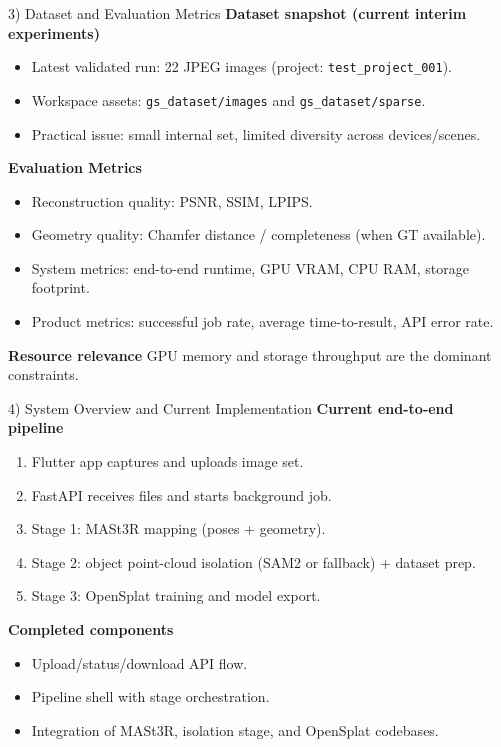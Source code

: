 \documentclass[aspectratio=169]{beamer}
\begin{document}
\begin{frame}{3) Dataset and Evaluation Metrics}
\textbf{Dataset snapshot (current interim experiments)}
\begin{itemize}
  \item Latest validated run: 22 JPEG images (project: \texttt{test\_project\_001}).
  \item Workspace assets: \texttt{gs\_dataset/images} and \texttt{gs\_dataset/sparse}.
  \item Practical issue: small internal set, limited diversity across devices/scenes.
\end{itemize}

\vspace{0.4em}
\textbf{Evaluation Metrics}
\begin{itemize}
  \item Reconstruction quality: PSNR, SSIM, LPIPS.
  \item Geometry quality: Chamfer distance / completeness (when GT available).
  \item System metrics: end-to-end runtime, GPU VRAM, CPU RAM, storage footprint.
  \item Product metrics: successful job rate, average time-to-result, API error rate.
\end{itemize}

\vspace{0.4em}
\textbf{Resource relevance}
GPU memory and storage throughput are the dominant constraints.
\end{frame}

\begin{frame}{4) System Overview and Current Implementation}
\textbf{Current end-to-end pipeline}
\begin{enumerate}
  \item Flutter app captures and uploads image set.
  \item FastAPI receives files and starts background job.
  \item Stage 1: MASt3R mapping (poses + geometry).
  \item Stage 2: object point-cloud isolation (SAM2 or fallback) + dataset prep.
  \item Stage 3: OpenSplat training and model export.
\end{enumerate}

\vspace{0.5em}
\textbf{Completed components}
\begin{itemize}
  \item Upload/status/download API flow.
  \item Pipeline shell with stage orchestration.
  \item Integration of MASt3R, isolation stage, and OpenSplat codebases.
\end{itemize}
\end{frame}
\end{document}
